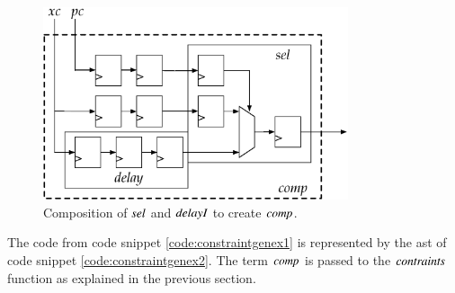 \begin{figure}[H]
\begin{center}
\centering
\includegraphics[width=0.8\textwidth]{images/compositionsel}
\end{center}
\caption{Composition of \ensuremath{\Varid{sel}} and \ensuremath{\Varid{delayI}} to create \ensuremath{\Varid{comp}}.} \label{fig:compositionsel}
\end{figure}


The code from code snippet \ref{code:constraintgenex1} is represented by the \gls{ast} of code snippet \ref{code:constraintgenex2}.
The term \ensuremath{\Varid{comp}} is passed to the \ensuremath{\Varid{contraints}} function as explained in the previous section.

